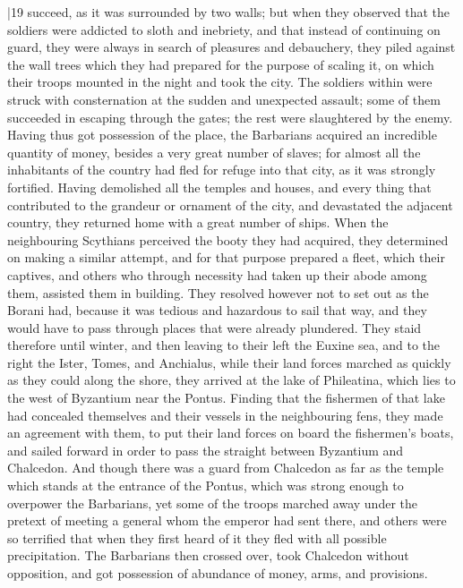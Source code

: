 |19 succeed, as it was surrounded by two walls; but when they observed that the soldiers were addicted to sloth and inebriety, and that instead of continuing on guard, they were always in search of pleasures and debauchery, they piled against the wall trees which they had prepared for the purpose of scaling it, on which their troops mounted in the night and took the city. The soldiers within were struck with consternation at the sudden and unexpected assault; some of them succeeded in escaping through the gates; the rest were slaughtered by the enemy. Having thus got possession of the place, the Barbarians acquired an incredible quantity of money, besides a very great number of slaves; for almost all the inhabitants of the country had fled for refuge into that city, as it was strongly fortified. Having demolished all the temples and houses, and every thing that contributed to the grandeur or ornament of the city, and devastated the adjacent country, they returned home with a great number of ships. When the neighbouring Scythians perceived the booty they had acquired, they determined on making a similar attempt, and for that purpose prepared a fleet, which their captives, and others who through necessity had taken up their abode among them, assisted them in building. They resolved however not to set out as the Borani had, because it was tedious and hazardous to sail that way, and they would have to pass through places that were already plundered. They staid therefore until winter, and then leaving to their left the Euxine sea, and to the right the Ister, Tomes, and Anchialus, while their land forces marched as quickly as they could along the shore, they arrived at the lake of Phileatina, which lies to the west of Byzantium near the Pontus. Finding that the fishermen of that lake had concealed themselves and
their vessels in the neighbouring fens, they made an agreement with them, to put their land forces on board the fishermen's boats, and sailed forward in order to pass the straight between Byzantium and Chalcedon. And though there was a guard from Chalcedon as far as the temple which stands at the entrance of the Pontus, which was strong enough to overpower the Barbarians, yet some of the troops marched away under the pretext of meeting a general whom the emperor had sent there, and others were so terrified that when they first heard of it they fled with all possible precipitation. The Barbarians then crossed over, took Chalcedon without opposition, and got possession of abundance of money, arms, and provisions.

